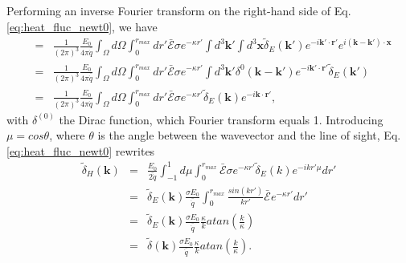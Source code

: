 \documentclass[twocolumns]{emulateapj}
\begin{document}




Performing an inverse Fourier transform on the right-hand side of Eq.\ref{eq:heat_fluc_newt0}, we have
\begin{eqnarray}
  \label{eq:right}
  &=& \frac{1}{(2\pi)^3} \frac{E_0}{4\pi\bar{\dot{q}}}\int_{\Omega}d\Omega\int_0^{r_{max}} dr'\bar{ \mathcal{E}}\sigma  e^{-\kappa r'} \int d^3\mathbf{k'}\int d^3\mathbf{x} \tilde{\delta}_E(\mathbf{k'})e^{-i\mathbf{k'}\cdot{\mathbf{r}'}} e^{i(\mathbf{k}-\mathbf{k'})\cdot\mathbf{x}} \\ \nonumber
  &=&\frac{1}{(2\pi)^3} \frac{E_0}{4\pi\bar{\dot{q}}} \int_{\Omega}d\Omega\int_0^{r_{max}}   dr' \bar{\mathcal{E}}\sigma  e^{-\kappa r'} \int d^3\mathbf{k'} \delta^{0}(\mathbf{k}-\mathbf{k}')e^{-i\mathbf{k'}\cdot{\mathbf{r}'}} \tilde{\delta}_E(\mathbf{k'})    \\ \nonumber
  &=&\frac{1}{(2\pi)^3} \frac{E_0}{4\pi\bar{\dot{q}}} \int_{\Omega}d\Omega\int_0^{r_{max}}  dr' \bar{ \mathcal{E}}\sigma  e^{-\kappa r'}  \tilde{\delta}_E(\mathbf{k}) e^{-i\mathbf{k}\cdot{\mathbf{r}'}}  ,
\end{eqnarray}
with $\delta^{(0)}$ the Dirac function, which Fourier transform equals 1. Introducing $\mu=cos\theta$, where $\theta$ is the angle between the wavevector and the line of sight, Eq. \ref{eq:heat_fluc_newt0} rewrites
\begin{eqnarray}
  \label{eq:heat_fluc_newt1}
  \tilde{\delta}_H(\mathbf{k})&=&  \frac{E_0}{\bar{2\dot{q}}} \int_{-1}^{1} d\mu \int_0^{r_{max}}  \bar{\mathcal{E}}\sigma  e^{-\kappa r'}  \tilde{\delta}_E(k) e^{-ikr'\mu}  dr'\\ \nonumber
&=&\tilde{\delta}_E(\mathbf{k})\frac{\sigma E_0}{\bar{\dot{q}}}\int_0^{r_{max}} \frac{sin(kr')}{kr'}   \bar{\mathcal{E}}  e^{-\kappa r'}   dr'\\ \nonumber
&=&\tilde{\delta}_E(\mathbf{k})\frac{\sigma E_0}{ \bar{\dot{q}}}\frac{\kappa}{k}  atan\left(\frac{k}{\kappa}\right)\\ \nonumber
&=&\tilde{\delta}(\mathbf{k})\frac{\sigma E_0}{ \bar{\dot{q}}}\frac{\kappa}{k}  atan\left(\frac{k}{\kappa}\right).\\ 
\end{eqnarray}
\end{document}
